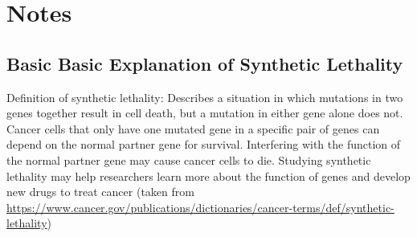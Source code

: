 \documentclass[10pt]{article}
\begin{document}







\newpage
\section{Notes}

\subsection{Basic Basic Explanation of Synthetic Lethality}
Definition of synthetic lethality: Describes a situation in which mutations in two genes together result in cell death, but a mutation in either gene alone does not. Cancer cells that only have one mutated gene in a specific pair of genes can depend on the normal partner gene for survival. Interfering with the function of the normal partner gene may cause cancer cells to die. Studying synthetic lethality may help researchers learn more about the function of genes and develop new drugs to treat cancer (taken from \url{https://www.cancer.gov/publications/dictionaries/cancer-terms/def/synthetic-lethality})
\end{document}
